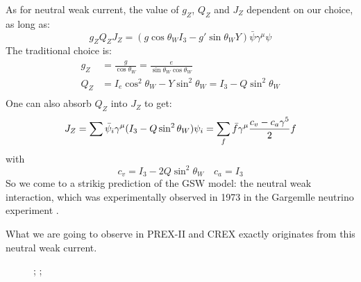 As for neutral weak current, the value of $g_Z$, $Q_Z$ and $J_Z$ dependent on our choice, 
as long as:
\begin{equation}
    g_Z Q_Z J_Z = (g\cos\theta_W I_3 - g'\sin\theta_W Y)\bar{\psi}\gamma^\mu\psi 
\end{equation}
The traditional choice is:
\begin{equation}
    \begin{aligned}
	g_Z &= \frac{g}{\cos\theta_W} = \frac{e}{\sin\theta_W\cos\theta_W}  \\
	Q_Z &= I_e\cos^2\theta_W - Y\sin^2\theta_W = I_3 - Q\sin^2\theta_W  \\
    \end{aligned}
\end{equation}
One can also absorb $Q_Z$ into $J_Z$ to get:
\begin{equation}
    J_Z = \sum \bar{\psi}_i\gamma^\mu (I_3 - Q\sin^2\theta_W)\psi_i
	= \sum_f \bar{f}\gamma^\mu\frac{c_v - c_a\gamma^5}{2} f \\
\end{equation}
with 
\begin{equation}
    c_v = I_3 - 2Q\sin^2\theta_W    \quad c_a = I_3
\end{equation}
So we come to a strikig prediction of the GSW model: the neutral weak interaction,
which was experimentally observed in 1973 in the Gargemlle neutrino experiment \cite{HASERT19741}.

What we are going to observe in PREX-II and CREX exactly originates from this
neutral weak current.

\begin{figure}[h]
    \centering
{};
;
\end{figure}

